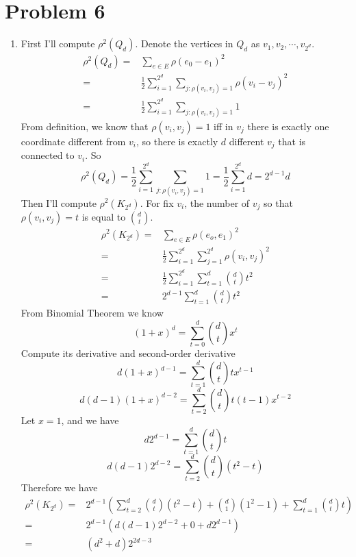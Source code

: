 \documentclass[twoside,11pt]{homework}
\begin{document}
\section*{Problem 6}
\begin{enumerate}
    \item 
    First I'll compute $\rho^2 (Q_d)$. Denote the vertices in $Q_d$ as $v_1,v_2, \cdots, v_{2^d}$.
    \begin{align*}
        \rho^2(Q_d) =& \sum_{e \in E} \rho(e_0-e_1)^2\\
        =& \frac{1}{2}\sum_{i = 1}^{2^d} \sum_{j: \rho(v_i,v_j)=1}\rho(v_i-v_j)^2\\
        =& \frac{1}{2}\sum_{i = 1}^ {2^d}  \sum_{j: \rho(v_i,v_j)=1} 1
    \end{align*}
    From definition, we know that $\rho(v_i,v_j)=1$ iff in $v_j$ there is exactly one coordinate different from $v_i$, so there is exactly $d$ different $v_j$ that is connected to $v_i$. So
    $$
        \rho^2(Q_d) = \frac{1}{2}\sum_{i = 1}^ {2^d}  \sum_{j: \rho(v_i,v_j)=1} 1 = \frac{1}{2}\sum_{i = 1}^ {2^d} d = 2^{d-1}d
    $$
    \newline
    Then I'll compute $\rho^2(K_{2^d})$.
    For fix $v_i$, the number of $v_j$ so that $\rho(v_i,v_j)=t$ is equal to ${d \choose t}$.
    \begin{align*}
        \rho^2(K_{2^d}) =& \sum_{e \in E}\rho(e_o,e_1)^2\\
        =&\frac{1}{2}\sum_{i=1}^{2^d}\sum_{j=1}^{2^d} \rho(v_i,v_j)^2\\
        =&\frac{1}{2}\sum_{i=1}^{2^d}\sum_{t=1}^{d} {d\choose t} t^2\\
        =& 2^{d-1}\sum_{t=1}^{d} {d\choose t} t^2
    \end{align*}
    From Binomial Theorem we know
    $$(1+x)^d = \sum_{t=0}^d {d \choose t}x^t$$
    Compute its derivative and second-order derivative
    $$d(1+x)^{d-1} = \sum_{t=1}^d {d \choose t}t x^{t-1}$$
    $$d(d-1) (1+x)^{d-2} = \sum_{t=2}^d {d \choose t}t(t-1)x^{t-2}$$
    Let $x=1$, and we have
    $$d 2^{d-1} = \sum_{t=1}^d {d \choose t} t$$
    $$d(d-1)2^{d-2} = \sum_{t=2}^d {d \choose t} (t^2-t)$$
    Therefore we have
    \begin{align*}
        \rho^2(K_{2^d}) =& 2^{d-1}(\sum_{t=2}^d {d \choose t} (t^2-t) +  {d \choose 1} (1^2-1) + \sum_{t=1}^d {d \choose t} t)\\
        =& 2^{d-1}(d(d-1)2^{d-2} + 0 + d2^{d-1})\\
        =&(d^2+d)2^{2d-3}
    \end{align*}
    

\end{enumerate}
\end{document}
